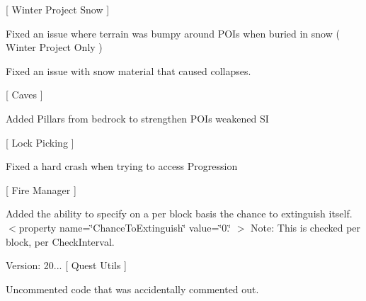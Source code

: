 \mbox{[} Winter Project Snow \mbox{]}
\begin{DoxyItemize}
\item Fixed an issue where terrain was bumpy around POIs when buried in snow ( Winter Project Only )
\item Fixed an issue with snow material that caused collapses.
\end{DoxyItemize}

\mbox{[} Caves \mbox{]}
\begin{DoxyItemize}
\item Added Pillars from bedrock to strengthen POIs weakened SI
\end{DoxyItemize}

\mbox{[} Lock Picking \mbox{]}
\begin{DoxyItemize}
\item Fixed a hard crash when trying to access Progression
\end{DoxyItemize}

\mbox{[} Fire Manager \mbox{]}
\begin{DoxyItemize}
\item Added the ability to specify on a per block basis the chance to extinguish itself. $<$property name=\char`\"{}\+Chance\+To\+Extinguish\char`\"{} value=\char`\"{}0.\char`\"{} $>$ Note\+: This is checked per block, per Check\+Interval.
\end{DoxyItemize}

Version\+: 20... \mbox{[} Quest Utils \mbox{]}
\begin{DoxyItemize}
\item Uncommented code that was accidentally commented out.
\end{DoxyItemize}

